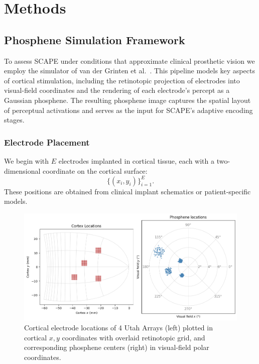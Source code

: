 \section{Methods}
\label{sec:methods}

\subsection{Phosphene Simulation Framework}
To assess SCAPE under conditions that approximate clinical prosthetic vision we employ the simulator of van der Grinten et al.\ \cite{vanderGrinten2024}. This pipeline models key aspects of cortical stimulation, including the retinotopic projection of electrodes into visual-field coordinates and the rendering of each electrode’s percept as a Gaussian phosphene. The resulting phosphene image captures the spatial layout of perceptual activations and serves as the input for SCAPE’s adaptive encoding stages.


\subsubsection{Electrode Placement}
We begin with \(E\) electrodes implanted in cortical tissue, each with a two-dimensional coordinate on the cortical surface:
\[
\{(x_i,y_i)\}_{i=1}^E.
\]
These positions are obtained from clinical implant schematics or patient-specific models.


\begin{figure}[h]
  \centering
  \includegraphics[width=0.9\columnwidth]{figures/cortextophosphenelocations4utaharrays.png}
  \caption{Cortical electrode locations of 4 Utah Arrays (left) plotted in cortical \(x,y\) coordinates with overlaid retinotopic grid, and corresponding phosphene centers (right) in visual‐field polar coordinates.}
  \label{fig:cortex-phosphene-locations}
\end{figure}

